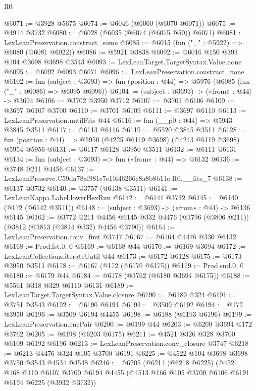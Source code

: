 \begin{lexlean}{R0}
\begin{coremodule}
@6071 := @3928 @5675
@6074 := @6046 (@6060 (@6070 @6071))
@6075 := @4914 @3732
@6080 := @6028 (@6035 (@6074 (@6075 @50)) @6071)
@6081 := LexLeanPreservation.construct_some
@6085 := @6015 (fun ("_" : @5922) => @6080 (@6081 @6022))
@6086 := @5921 @3838
@6092 := @6016 @150 @393 @104 @3698 @3698 @3543
@6093 := LexLeanTarget.TargetSyntax.Value.none
@6095 := @6092 @6093 @6071
@6096 := LexLeanPreservation.construct_none
@6102 := fun (subject : @3693) =>
  fun (position : @44) => @5976 (@6085 (fun ("_" : @6086) => @6095 @6096))
@6104 := (subject : @3693) -> («from» : @44) -> @3694
@6106 := @3702 @3950 @3712
@6107 := @3701 @6106
@6109 := @3697 @6107 @3700
@6110 := @3701 @6109
@6111 := @3697 @6110
@6113 := LexLeanPreservation.untilFits @44
@6116 := fun (__p0 : @44) => @5943 @3845 @3511
@6117 := @6113 @6116
@6119 := @5520 @3845 @3511
@6128 := fun (position : @44) => @5950 (@4225 @6119 @3698) (@4243 @6119 @3698) @5954 @5956
@6131 := @6117 @6128 @3950 @3511
@6132 := @6111 @6131
@6134 := fun (subject : @3693) => fun («from» : @44) => @6132
@6136 := @3748 @211 @4456
@6137 := LexLeanPreserve.C59da78af981c7e10f46266c8a8b8b11e.R0.__fits_7
@6138 := @6137 @3732
@6140 := @3757 (@6138 @3511)
@6141 := LexLeanKappa.Label.lowerHexRun
@6142 := @6141 @3732
@6145 := @6140 (@172 (@6142 @3511))
@6148 := (subject : @3693) -> («from» : @44) -> @6136 @6145
@6162 := @3772
    @211
    @4456
    @6145
    @332
    @4476
    (@3796 (@3806 @211))
    (@3812 (@3813 (@3814 @332) @4456 @3790))
@6164 := LexLeanPreservation.conv_first @3747
@6167 := @6164 @4476 @330 @6132
@6168 := Prod.fst.{0, 0}
@6169 := @6168 @44
@6170 := @6169 @3694
@6172 := LexLeanCollections.iterateUntil @44
@6173 := @6172 @6128
@6175 := @6173 @3950 @3511
@6178 := @6167 (@172 (@6170 @6175))
@6179 := Prod.snd.{0, 0}
@6180 := @6179 @44
@6184 := @6178 (@3762 (@6180 @3694 @6175))
@6188 := @5561 @318 @329 @6110 @6131
@6189 := LexLeanTarget.TargetSyntax.Value.closure
@6190 := @6189 @324
@6191 := @3751 @3543
@6192 := @6190 @6191
@6193 := @3509 @6192
@6194 := @172 @3950
@6196 := @3509 @6194 @4455
@6198 := @6188 (@6193 @6196)
@6199 := LexLeanPreservation.encPair
@6200 := @6199 @44
@6203 := @6200 @3694 @172 @3762
@6205 := @6198 (@6203 @6175)
@6211 := @4521 @326 @328 @3700 @6109 @6192 @6196
@6213 := LexLeanPreservation.conv_closure @3747
@6218 := @6213 @4476 @324 @105 @3700 @6191
@6225 := @4522 @104 @3698 @3698 @3750 @3543 @4534 @4548
@6246 := @6205
    (@6211
      (@6218 @6225)
      (@4521
        @168
        @110
        @6107
        @3700
        @6194
        @4455
        (@4513 @166 @105 @3700 @6106 @6191 @6194 @6225 (@3932 @3732))

\end{coremodule}
\end{lexlean}
